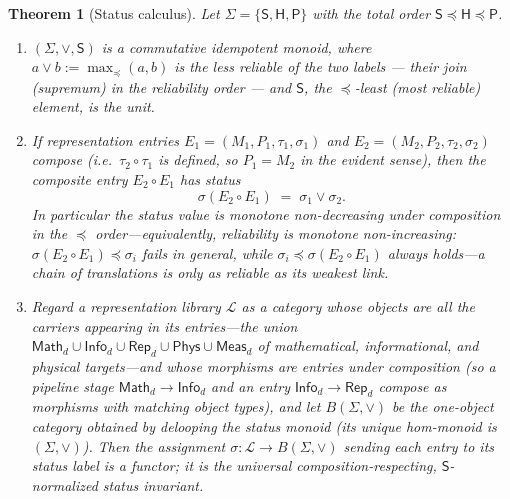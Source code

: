 \documentclass[12pt]{article}
\newtheorem{theorem}{Theorem}[section]
\theoremstyle{definition}
\theoremstyle{remark}
\newcommand{\Math}{\mathsf{Math}}
\newcommand{\Phys}{\mathsf{Phys}}
\newcommand{\Info}{\mathsf{Info}}
\newcommand{\Rep}{\mathsf{Rep}}
\newcommand{\Meas}{\mathsf{Meas}}
\newcommand{\Sstat}{\mathsf{S}}
\newcommand{\Hstat}{\mathsf{H}}
\newcommand{\Pstat}{\mathsf{P}}
\newcommand{\stO}{\preceq}
\begin{document}
\begin{theorem}[Status calculus]
\label{thm:status}
Let $\Sigma = \{\Sstat, \Hstat, \Pstat\}$ with the total order
$\Sstat \stO \Hstat \stO \Pstat$.
\begin{enumerate}[leftmargin=2.2em]
\item $(\Sigma, \vee, \Sstat)$ is a commutative idempotent monoid, where
  $a \vee b := \max_{\stO}(a,b)$ is the \emph{less reliable} of the two labels
  --- their \emph{join} (supremum) in the reliability order --- and $\Sstat$,
  the $\stO$-least (most reliable) element, is the unit.
\item If representation entries $E_1 = (M_1,P_1,\tau_1,\sigma_1)$ and
  $E_2 = (M_2,P_2,\tau_2,\sigma_2)$ compose (i.e.\ $\tau_2 \circ \tau_1$ is
  defined, so $P_1 = M_2$ in the evident sense), then the composite entry
  $E_2 \circ E_1$ has status
  \[
    \sigma(E_2 \circ E_1) \;=\; \sigma_1 \vee \sigma_2.
  \]
  In particular the status \emph{value} is \emph{monotone non-decreasing} under
  composition in the $\stO$ order---equivalently, \emph{reliability} is monotone
  non-increasing: $\sigma(E_2\circ E_1) \stO \sigma_i$ fails in general, while
  $\sigma_i \stO \sigma(E_2\circ E_1)$ always holds---a chain of translations is
  only as reliable as its weakest link.
\item Regard a representation library $\mathcal{L}$ as a category whose objects
  are \emph{all} the carriers appearing in its entries---the union
  $\Math_d \cup \Info_d \cup \Rep_d \cup \Phys \cup \Meas_d$ of mathematical,
  informational, and physical targets---and whose morphisms are entries under
  composition (so a pipeline stage $\Math_d \to \Info_d$ and an entry
  $\Info_d \to \Rep_d$ compose as morphisms with matching object types), and let
  $B(\Sigma,\vee)$ be the one-object category obtained by delooping the
  status monoid (its unique hom-monoid is $(\Sigma,\vee)$). Then the assignment
  $\sigma : \mathcal{L} \to B(\Sigma,\vee)$ sending each entry to its status
  label is a \emph{functor}; it is the universal composition-respecting,
  $\Sstat$-normalized status invariant.
\end{enumerate}
\end{theorem}
\end{document}
